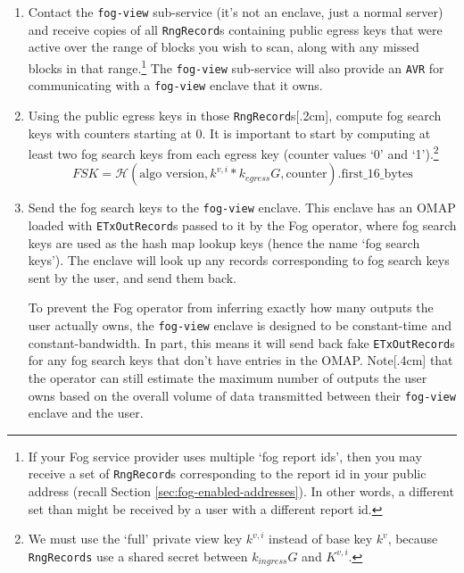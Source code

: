 \begin{enumerate}
    \item Contact the {\tt fog-view} sub-service (it's not an enclave, just a normal server) and receive copies of all {\tt RngRecord}s containing public egress keys that were active over the range of blocks you wish to scan, along with any missed blocks in that range.\footnote{If your Fog service provider uses multiple `fog report ids', then you may receive a set of {\tt RngRecord}s corresponding to the report id in your public address (recall Section \ref{sec:fog-enabled-addresses}). In other words, a different set than might be received by a user with a different report id.} The {\tt fog-view} sub-service will also provide an {\tt AVR} for communicating with a {\tt fog-view} enclave that it owns.

    \item Using the public egress keys in those {\tt RngRecord}s[.2cm], compute fog search keys with counters starting at 0. It is important to start by computing at least two fog search keys from each egress key (counter values `0' and `1').\footnote{We must use the `full' private view key $k^{v,i}$ instead of base key $k^v$, because {\tt RngRecords} use a shared secret between $k_{ingress} G$ and $K^{v,i}$.}\vspace{.155cm}
    \[FSK = \mathcal{H}(\textrm{algo version}, k^{v,i}*k_{egress} G, \textrm{counter})\textrm{.first\_16\_bytes}\]

    \item Send the fog search keys to the {\tt fog-view} enclave. This enclave has an OMAP loaded with {\tt ETxOutRecord}s passed to it by the Fog operator, where fog search keys are used as the hash map lookup keys (hence the name `fog search keys'). The enclave will look up any records corresponding to fog search keys sent by the user, and send them back.

    To prevent the Fog operator from inferring exactly how many outputs the user actually owns, the {\tt fog-view} enclave is designed to be constant-time and constant-bandwidth. In part, this means it will send back fake {\tt ETxOutRecord}s for any fog search keys that don't have entries in the OMAP. Note[.4cm] that the operator can still estimate the maximum number of outputs the user owns based on the overall volume of data transmitted between their {\tt fog-view} enclave and the user.


\end{enumerate}
